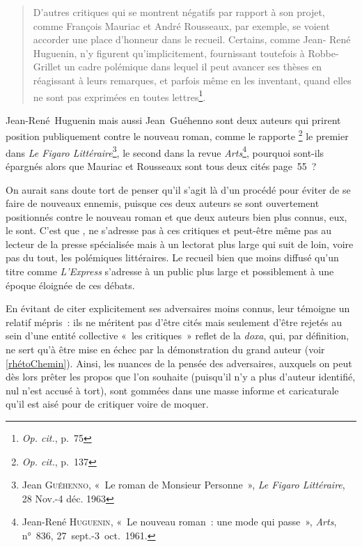 \begin{quote}
    D'autres critiques qui se montrent négatifs par rapport à son projet,
comme François Mauriac et André Rousseaux, par exemple, se voient
accorder une place d’honneur dans le recueil. Certains, comme Jean-
René Huguenin, n’y figurent qu’implicitement, fournissant toutefois à
Robbe-Grillet un cadre polémique dans lequel il peut avancer ses
thèses en réagissant à leurs remarques, et parfois même en les inventant,
quand elles ne sont pas exprimées en toutes lettres\footnote{\textit{Op. cit.}, p.~75}.
\end{quote}

Jean-René~Huguenin mais aussi Jean~Guéhenno sont deux auteurs qui prirent position publiquement contre le nouveau roman, comme le rapporte \galia\footnote{\textit{Op. cit.}, p.~137} le premier dans \textit{Le Figaro Littéraire}\footnote{Jean \textsc{Guéhenno}, «~Le roman de Monsieur Personne~»,\textit{ Le Figaro Littéraire}, 28 Nov.-4 déc. 1963}, le second dans la revue \textit{Arts}\footnote{Jean-René \textsc{Huguenin}, «~Le nouveau roman~: une mode qui passe~», \textit{Arts}, n°~836, 27~sept.-3~oct.~1961.}, pourquoi sont-ils épargnés alors que Mauriac et Rousseaux sont tous deux cités page~55~?

On aurait sans doute tort de penser qu'il s'agit là d'un procédé pour éviter de se faire de nouveaux ennemis, puisque ces deux auteurs se sont ouvertement positionnés contre le nouveau roman et que deux auteurs bien plus connus, eux, le sont. C'est que \punr, ne s'adresse pas à ces critiques et peut-être même pas au lecteur de la presse spécialisée mais à un lectorat plus large qui suit de loin, voire pas du tout, les polémiques littéraires. Le recueil bien que moins diffusé qu'un titre comme \textit{L'Express} s'adresse à un public plus large et possiblement à une époque éloignée de ces débats. 

En évitant de citer explicitement ses adversaires moins connus, \robbe{} leur témoigne un relatif mépris~: ils ne méritent pas d'être cités mais seulement d'être rejetés au sein d'une entité collective «~les critiques~» reflet de la \textit{doxa}, qui, par définition, ne sert qu'à être mise en échec par la démonstration du grand auteur (voir \ref{rhétoChemin}). Ainsi, les nuances de la pensée des adversaires, auxquels on peut dès lors prêter les propos que l'on souhaite (puisqu'il n'y a plus d'auteur identifié, nul n'est accusé à tort), sont gommées dans une masse informe et caricaturale qu'il est aisé pour \robbe{} de critiquer voire de moquer.

